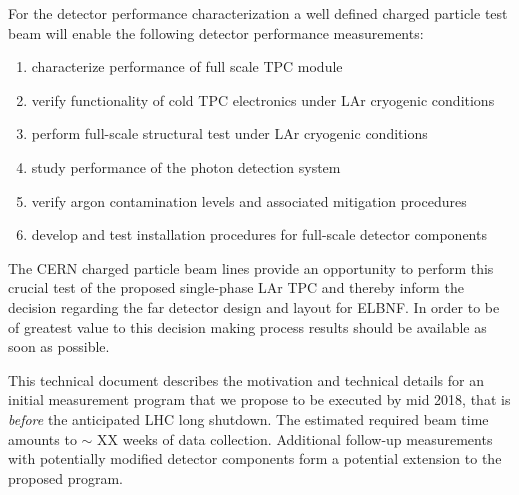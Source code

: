 For the detector performance characterization a well defined charged particle test beam will 
enable the following detector performance measurements:
\begin{enumerate}
 \item characterize performance of full scale TPC module
 \item verify functionality of cold TPC electronics under LAr cryogenic conditions
 \item perform full-scale structural test under LAr cryogenic conditions
 \item study performance of the photon detection system
 \item verify argon contamination levels and associated mitigation procedures
 \item develop and test installation procedures for full-scale detector components
\end{enumerate}


The CERN charged particle beam lines provide an opportunity to perform this crucial test of the 
proposed single-phase LAr TPC and thereby inform the decision regarding the far detector design and layout for ELBNF.
In order to be of greatest value to this decision making process results should be available as soon as possible.

This technical document describes the motivation and technical details for an initial  measurement program that we propose to be executed by mid 2018, 
that is {\it before} the anticipated LHC long shutdown. The estimated required beam time amounts to $\sim$ XX weeks of data collection. 
%
Additional follow-up measurements with potentially modified detector components form a potential extension to the proposed program.



